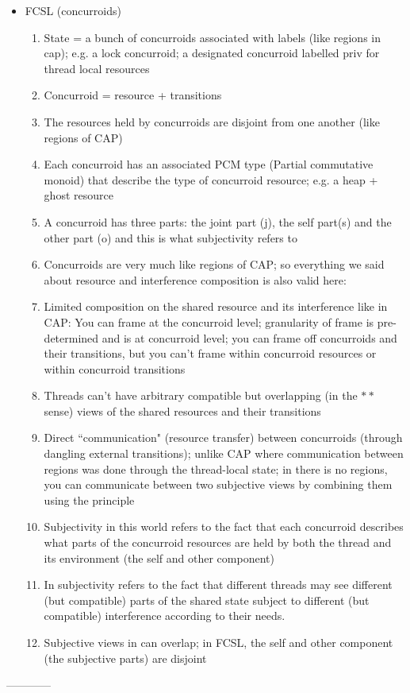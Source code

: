 \begin{itemize}
		\item FCSL (concurroids)
		\begin{enumerate}
			\item State = a bunch of concurroids associated with labels (like regions in cap); e.g. a lock concurroid; a designated  concurroid labelled \textsf{priv} for thread local resources
			\item Concurroid = resource + transitions
			\item The resources held by concurroids are disjoint from one another (like regions of CAP)
			\item Each concurroid has an associated PCM type (Partial commutative monoid)  that describe the type of concurroid resource; e.g. a heap + ghost resource
			\item A concurroid has three parts: the joint part (j), the self part(s) and the other part (o) and this is what subjectivity refers to
			\item Concurroids are very much like regions of CAP; so everything we said about resource and interference composition is also valid here:		
			\item  Limited composition on the shared resource and its interference like in CAP: You can frame at the concurroid level; granularity of frame is pre-determined and is at concurroid level; you can frame off concurroids and their transitions, but you can't frame within concurroid resources or within concurroid transitions 
			\item Threads can't have arbitrary compatible but overlapping (in the $**$ sense) views of the shared resources and their transitions
			\item Direct ``communication" (resource transfer) between concurroids (through dangling external transitions); unlike CAP where communication between regions was done through the thread-local state; in \colosl there is no regions, you can communicate between two subjective views by combining them using the \mergeRule principle
			\item Subjectivity in this world refers to the fact that each concurroid describes what parts of the concurroid resources are held by both the thread and its environment (the self and other component)
			\item In \colosl subjectivity refers to the fact that different threads may see different (but compatible) parts of the shared state subject to different (but compatible) interference according to their needs. 
			\item Subjective views in \colosl can overlap; in FCSL, the self and other component (the subjective parts) are disjoint
		\end{enumerate}
\end{itemize}
------------

